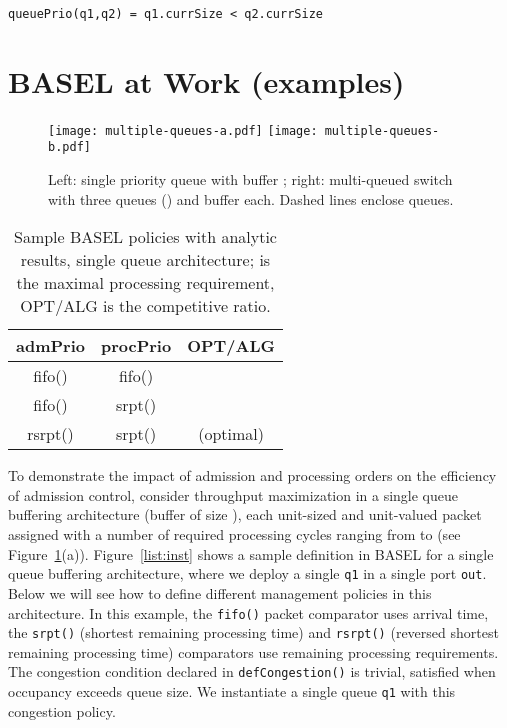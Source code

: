 \documentclass{article}
\newcommand{\barch}{BASEL}
\begin{document}
\begin{lstlisting}[basicstyle=\ttfamily\footnotesize]
queuePrio(q1,q2) = q1.currSize < q2.currSize
\end{lstlisting}


\section{\barch{} at Work (examples)}\label{sec:examples}



\begin{figure}
\centerline{
\texttt{[image: multiple-queues-a.pdf]}
\texttt{[image: multiple-queues-b.pdf]}
}
\vspace{-10pt}
\caption{Left: single priority queue with buffer ; right: multi-queued switch with three queues () and buffer  each. Dashed lines enclose queues.}
\label{fig:model}
\end{figure}

\newcommand{\ttfam}[1]{{\ttfamily\footnotesize #1}}

\begin{table} \centering
\small
\vspace{2mm}
	\lstset{basicstyle=\ttfamily\footnotesize}
\begin{tabular}{ccc}\hline
\ttfam{admPrio}  & \ttfam{procPrio} & OPT/ALG \\\hline
\ttfam{fifo()} & \ttfam{fifo()}  &  \\
\ttfam{fifo()} & \ttfam{srpt()}  &  \\
\ttfam{rsrpt()} & \ttfam{srpt()} &  (optimal) \\\hline
\end{tabular}
\vspace{2pt}
\caption{
  Sample \barch{} policies with analytic results, single queue architecture;
   is the maximal processing requirement, OPT/ALG
  is the competitive ratio.
}\label{tbl:single-queue}
\end{table}




To demonstrate the impact of admission and processing orders on the efficiency of admission control, consider throughput maximization in a single queue buffering architecture (buffer of size ), each unit-sized and unit-valued packet assigned with a number of required processing cycles ranging from  to  (see Figure~\ref{fig:model}(a)).
Figure~\ref{list:inst} shows a sample definition in \barch{} for a single queue buffering architecture, where we
deploy a single \lstinline|q1| in a single port \lstinline|out|. Below we will see how to define different
management policies in this architecture. In this example, the \lstinline|fifo()| packet comparator uses
arrival time, the \lstinline|srpt()| (shortest remaining processing time) and \lstinline|rsrpt()| (reversed shortest remaining processing time) comparators use remaining processing requirements. The congestion condition
declared in \lstinline|defCongestion()| is trivial, satisfied when
occupancy exceeds queue size. We instantiate a single queue \lstinline|q1| 
with this congestion policy. 
\end{document}

